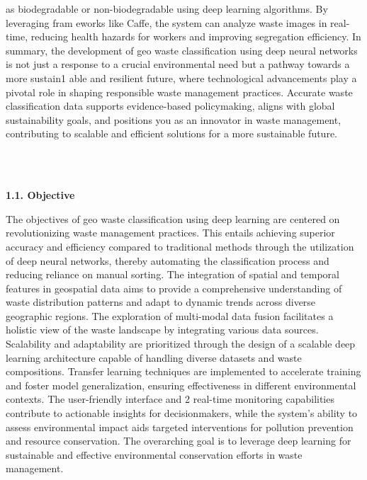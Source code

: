 \documentclass[12pt, English]{article}
\begin{document}
\begin{normalsize}
as biodegradable or non-biodegradable using deep learning
algorithms. By leveraging fram eworks like Caffe, the system
can analyze waste images in real-time, reducing health hazards
for workers and improving segregation efficiency. In summary,
the development of geo waste classification using deep neural networks is not just
a response to a crucial environmental need but a pathway towards a more sustain1
able and resilient future, where technological advancements play a pivotal role in shaping responsible waste management practices. Accurate waste classification data supports evidence-based policymaking, aligns with global sustainability goals, and positions you as an innovator in waste management, contributing to scalable and efficient solutions for a more sustainable future. 
\end{normalsize}
\\\
\begin{large}
\textbf{1.1. Objective}
\end{large}
\begin{normalsize}
    
The objectives of geo waste classification using deep learning are centered on
revolutionizing waste management practices. This entails achieving superior accuracy and efficiency compared to traditional methods through the utilization of
deep neural networks, thereby automating the classification process and reducing
reliance on manual sorting. The integration of spatial and temporal features in
geospatial data aims to provide a comprehensive understanding of waste distribution patterns and adapt to dynamic trends across diverse geographic regions.
The exploration of multi-modal data fusion facilitates a holistic view of the waste
landscape by integrating various data sources. Scalability and adaptability are
prioritized through the design of a scalable deep learning architecture capable of
handling diverse datasets and waste compositions. Transfer learning techniques
are implemented to accelerate training and foster model generalization, ensuring
effectiveness in different environmental contexts. The user-friendly interface and
2
real-time monitoring capabilities contribute to actionable insights for decisionmakers, while the system’s ability to assess environmental impact aids targeted
interventions for pollution prevention and resource conservation. The overarching goal is to leverage deep learning for sustainable and effective environmental
conservation efforts in waste management.\\
\end{normalsize}
\end{document}
